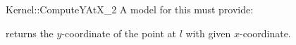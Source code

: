 \begin{ccRefFunctionObjectConcept}{Kernel::ComputeYAtX_2}
A model for this must provide:


       {returns the $y$-coordinate of the point at $l$ with
        given $x$-coordinate.
        }

\ccRefines
{}

\ccSeeAlso
{} \\

\end{ccRefFunctionObjectConcept}
